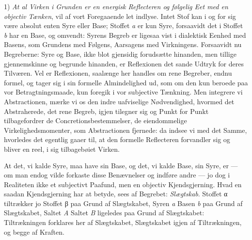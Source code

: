 \documentclass[12pt,a4paper]{book}
\begin{document}
1) \emph{At al Virken i Grunden er en energisk
Reflecteren og følgelig Eet med en objectiv Tænken},
vil af vort Foregaaende let indlyse. Intet Stof kan i og
for sig være absolut enten Syre eller Base; Stoffet \textit{a} er
kun Syre, forsaavidt det i Stoffet \textit{b} har en Base, og
omvendt: Syrens Begreb er ligesaa vist i dialektisk Eenhed med
Basens, som Grundens med Følgens, Aarsagens med
Virkningens. Forsaavidt nu Begreberne: Syre og Base, ikke
blot gjensidig forudsætte hinanden, men tillige gjennemskinne
og begrunde hinanden, er Reflexionen det sande Udtryk for
deres Tilværen. Vel er Reflexionen, saalænge her handles
om rene Begreber, endnu formel, og tager sig i sin formelle
Almindelighed ud, som om den kun beroede paa vor
Betragtningsmaade, kun foregik i vor subjective Tænkning. Men
integrere vi Abstractionen, mærke vi os den indre uafviselige
Nødvendighed, hvormed det Abstraherede, det rene Begreb,
igjen tilegner sig og Punkt for Punkt tilbagefordrer de
Concretionsbestemmelser, de eiendommelige Virkelighedsmomenter,
som Abstractionen fjernede: da indsee vi med det Samme,
hvorledes det egentlig gaaer til, at den formelle Reflecteren
forvandler sig og bliver en reel, i sig tilbagebøiet Virken.

At det, vi kalde Syre, maa have sin Base, og det, vi
kalde Base, sin Syre, er --- om man endog vilde forkaste
disse Benævnelser og indføre andre --- jo dog i Realiteten
ikke et subjectivt Paafund, men en objectiv Kjendsgjerning.
Hvad en saadan Kjendsgjerning har at betyde, sees af
Begrebet: \emph{Slægtskab}. Stoffet α tiltrækker jo Stoffet β paa
Grund af Slægtskabet, Syren \textit{a} Basen \textit{b} paa Grund af
Slægtskabet, Saltet \textit{A} Saltet \textit{B} ligeledes paa Grund af
Slægtskabet: Tiltrækningen forklares her af Slægtskabet,
Slægtskabet igjen af Tiltrækningen, og begge af Kraften.
\end{document}
